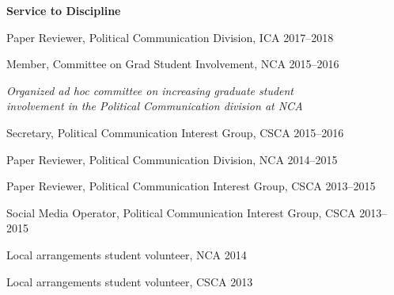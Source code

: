 \documentclass[11pt,letterpaper]{article}
\begin{document}
\textbf{Service to Discipline}
\begin{innerlist}
  \item Paper Reviewer, Political Communication Division, ICA \hfill 2017--2018
  \item Member, Committee on Grad Student Involvement, NCA \hfill 2015--2016
  \begin{outerlist}
    \item[]\textit{Organized ad hoc committee on increasing graduate student \\
      involvement in the Political Communication division at NCA}\bigskip
  \end{outerlist}
  \item Secretary, Political Communication Interest Group, CSCA \hfill 2015--2016
  \item Paper Reviewer, Political Communication Division, NCA \hfill 2014--2015
  \item Paper Reviewer, Political Communication Interest Group, CSCA \hfill 2013--2015
  \item Social Media Operator, Political Communication Interest Group, CSCA \hfill 2013--2015
  \item Local arrangements student volunteer, NCA \hfill 2014
  \item Local arrangements student volunteer, CSCA \hfill 2013
\end{innerlist}
\end{document}
